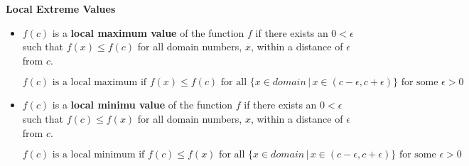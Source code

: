 \documentclass{ximera}
\begin{document}
\textbf{Local Extreme Values} \\
\begin{itemize}
\item $f(c)$ is a \textbf{local maximum value} of the function $f$ if there exists an $0 < \epsilon$ such that $f(x) \leq f(c)$ for all domain numbers, $x$, within a distance of $\epsilon$ from $c$. 

\[  f(c) \text{ is a local maximum if } f(x) \leq f(c) \text{ for all } \{ x \in domain \, | \, x \in (c - \epsilon, c + \epsilon) \} \text{ for some } \epsilon > 0 \]







\item $f(c)$ is a \textbf{local minimu value} of the function $f$ if there exists an $0 < \epsilon$ such that $f(c) \leq f(x)$ for all domain numbers, $x$, within a distance of $\epsilon$ from $c$. 



\[  f(c) \text{ is a local minimum if } f(c) \leq f(x) \text{ for all } \{ x \in domain \, | \, x \in (c - \epsilon, c + \epsilon) \} \text{ for some } \epsilon > 0 \]
\end{itemize}
\end{document}
